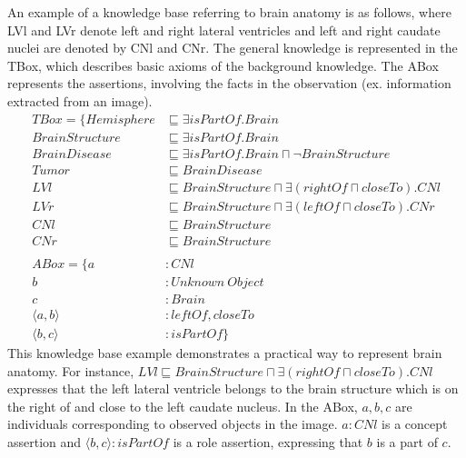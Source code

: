 \documentclass{article}
\begin{document}
An example of a knowledge base referring to brain anatomy is as follows, where LVl and LVr denote left and right lateral ventricles and left and right caudate nuclei are denoted by CNl and CNr.
The general knowledge is represented in the TBox, which describes basic axioms of the background knowledge. The ABox represents the assertions, involving the facts in the observation (ex. information
extracted from an image).
\begin{align*}
 TBox=\{ Hemisphere &\sqsubseteq \exists isPartOf. Brain\\
	 BrainStructure &\sqsubseteq \exists isPartOf. Brain\\
	 BrainDisease &\sqsubseteq \exists isPartOf. Brain \sqcap \neg BrainStructure\\
	 Tumor  &\sqsubseteq BrainDisease\\
	 LVl &\sqsubseteq BrainStructure \sqcap \exists (rightOf \sqcap closeTo). CNl\\
	 LVr &\sqsubseteq BrainStructure \sqcap \exists (leftOf \sqcap closeTo). CNr\\
	 CNl &\sqsubseteq BrainStructure\\
	 CNr &\sqsubseteq BrainStructure\\
\\
 ABox=\{ a&: CNl \\
	 b&: Unknown~Object\\
	 c&: Brain \\
	 \langle a,b\rangle &: leftOf, closeTo \\
	 \langle b,c\rangle &: isPartOf\}
\end{align*}
This knowledge base  example demonstrates a practical way to represent brain anatomy. 
For instance, $LVl \sqsubseteq BrainStructure \sqcap \exists (rightOf \sqcap closeTo). CNl$ expresses that
the left lateral ventricle belongs to the brain structure which is on the right of and close to the left caudate nucleus.
In the ABox, $a,b,c$ are individuals corresponding to observed objects in the image. $a: CNl$ is a concept assertion and 
$\langle b,c\rangle : isPartOf$ is a role assertion, expressing that $b$ is a part of $c$.
\end{document}
